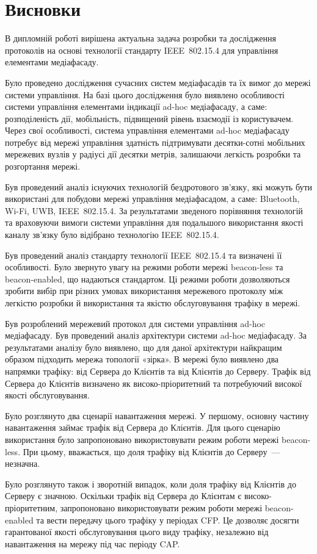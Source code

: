 \documentclass[a4paper,ukrainian,utf8,nocolumnsxix,nocolumnxxxii,nocolumnxxxi,floatsection,equationsection]{eskdtext}
\newcommand{\sectionnonum}[1]{\section*{#1}\addcontentsline{toc}{section}{#1}}
\newcommand{\iee}[0]{IEEE~802.15.4\xspace}
\newcommand{\blm}[0]{beacon-less\xspace}
\newcommand{\bem}[0]{beacon-enabled\xspace}
\begin{document}
\sectionnonum{Висновки}

В дипломній роботі вирішена актуальна задача розробки та дослідження протоколів на основі технології стандарту \iee для управління елементами медіафасаду.

Було проведено дослідження сучасних систем медіафасадів та їх вимог до мережі системи управління. На базі цього дослідження було виявлено особливості системи управління елементами індикації ad-hoc медіафасаду, а саме: розподіленість дії, мобільність, підвищений рівень взаємодії із користувачем. Через свої особливості, система управління елементами ad-hoc медіафасаду потребує від мережі управління здатність підтримувати десятки-сотні мобільних мережевих вузлів у радіусі дії десятки метрів, залишаючи легкість розробки та розгортання мережі.

Був проведений аналіз існуючих технологій бездротового зв’язку, які можуть бути використані для побудови мережі управління медіафасадом, а саме: Bluetooth, Wi-Fi, UWB, \iee. За результатами зведеного порівняння технологій та враховуючи вимоги системи управління для подальшого використання  якості каналу зв'язку було відібрано технологію \iee.

Був проведений аналіз стандарту технології \iee та визначені її особливості. Було звернуто увагу на режими роботи мережі \blm та \bem, що надаються стандартом. Ці режими роботи дозволяються зробити вибір при різних умовах використання мережевого протоколу між легкістю розробки й використання та якістю обслуговування трафіку в мережі.

Був розроблений мережевий  протокол для системи управління ad-hoc медіафасаду. Був проведений аналіз архітектури системи ad-hoc медіафасаду. За результатами аналізу було виявлено, що для даної архітектури найкращим образом підходить мережа топології «зірка». В мережі було виявлено два напрямки трафіку: від Сервера до Клієнтів та від Клієнтів до Серверу. Трафік від Сервера до Клієнтів визначено як високо-пріоритетний та потребуючий високої якості обслуговування.

Було розглянуто два сценарії навантаження мережі. У першому, основну частину навантаження займає трафік від Сервера до Клієнтів. Для цього сценарію використання було запропоновано використовувати режим роботи мережі \blm. При цьому, вважається, що доля трафіку від Клієнтів до Серверу~--- незначна.

Було розглянуто також і зворотній випадок, коли доля трафіку від Клієнтів до Серверу є значною. Оскільки трафік від Сервера до Клієнтам є високо-пріоритетним, запропоновано використовувати режим роботи мережі \bem та вести передачу цього трафіку у періодах CFP. Це дозволяє досягти гарантованої якості обслуговування цього виду трафіку, незалежно від навантаження на мережу під час періоду CAP.
\end{document}
